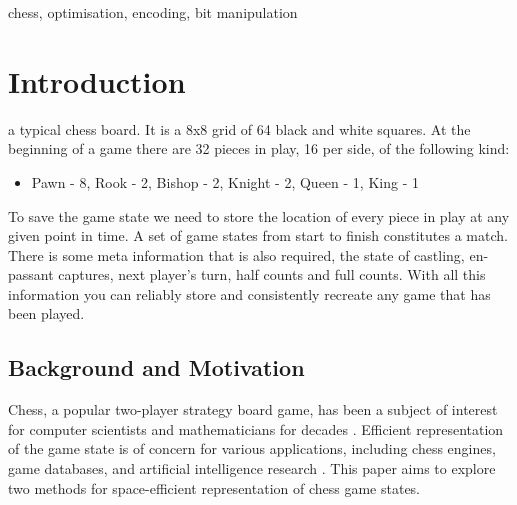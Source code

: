\documentclass[journal]{journal}
\begin{document}
\begin{IEEEkeywords}
chess, optimisation, encoding, bit manipulation
\end{IEEEkeywords}






%
\IEEEpeerreviewmaketitle




\section{Introduction}
% 
% 
% 
% 
 a typical chess board. It is a 8x8 grid of 64 black and white squares.
At the beginning of a game there are 32 pieces in play, 16 per side, of the following kind:
\begin{itemize}
  \item Pawn - 8, Rook - 2, Bishop - 2, Knight - 2, Queen - 1, King - 1
\end{itemize}

To save the game state we need to store the location of every piece in play at any given point in time. A set of game states from start to finish constitutes a match. There is some meta information that is also required, the state of castling, en-passant captures, next player's turn, half counts and full counts. With all this information you can reliably store and consistently recreate any game that has been played.

\subsection{Background and Motivation}
Chess, a popular two-player strategy board game, has been a subject of interest for computer scientists and mathematicians for decades \cite{shannon1993programming, campbell2002deep}. Efficient representation of the game state is of concern for various applications, including chess engines, game databases, and artificial intelligence research \cite{stockfish,lc0}. This paper aims to explore two methods for space-efficient representation of chess game states. 
\end{document}
